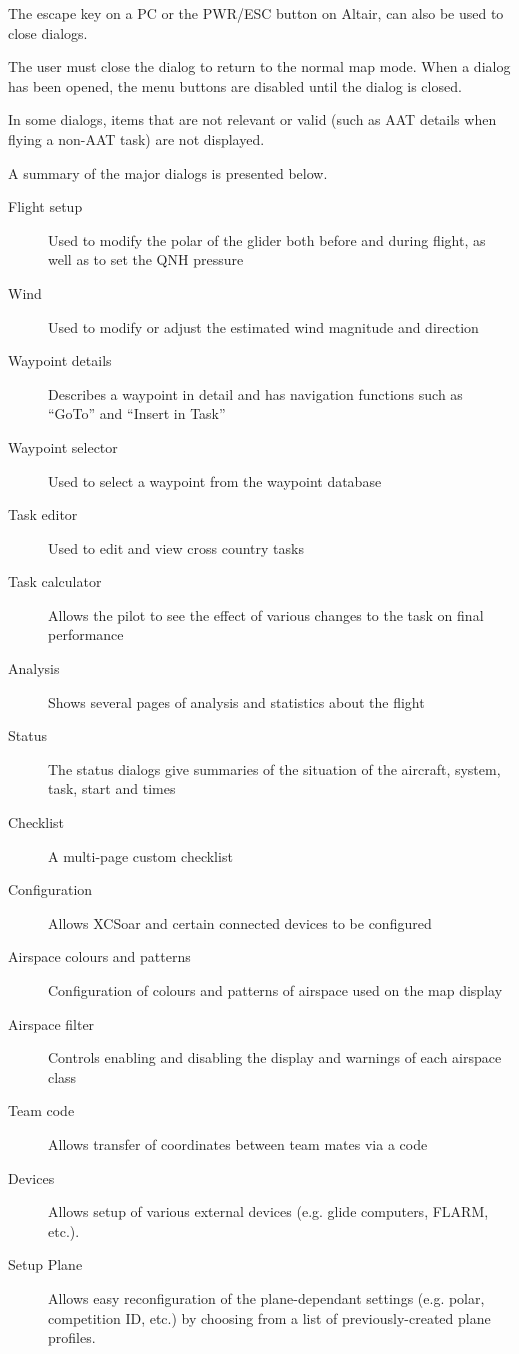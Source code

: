 The escape key on a PC or the PWR/ESC button on Altair, can also be used to
close dialogs.

The user must close the dialog to return to the normal map mode. When a dialog
has been opened, the menu buttons are disabled until the dialog is closed.

In some dialogs, items that are not relevant or valid (such as AAT details when
flying a non-AAT task) are not displayed.

 A summary of the
major dialogs is presented below.
\begin{description}
\item[Flight setup] Used to modify the polar of the glider both before and
during flight, as well as to set the QNH pressure
\item[Wind] Used to modify or adjust the estimated wind magnitude and direction
\item[Waypoint details] Describes a waypoint in detail and has navigation
functions such as ``GoTo'' and ``Insert in Task''
\item[Waypoint selector] Used to select a waypoint from the waypoint database
\item[Task editor] Used to edit and view cross country tasks
\item[Task calculator] Allows the pilot to see the effect of various changes to
the task on final performance
\item[Analysis] Shows several pages of analysis and statistics about the flight
\item[Status] The status dialogs give summaries of the situation of the 
aircraft, system, task, start and times
\item[Checklist] A multi-page custom checklist
\item[Configuration] Allows XCSoar and certain connected devices to be
configured
\item[Airspace colours and patterns] Configuration of colours and patterns of
airspace used on the map display
\item[Airspace filter] Controls enabling and disabling the display and warnings
of each airspace class
\item[Team code] Allows transfer of coordinates between team mates via a code
\item[Devices]  Allows setup of various external devices (e.g. glide computers, FLARM, etc.).
\item[Setup Plane]  Allows easy reconfiguration of the plane-dependant settings (e.g. polar, competition ID, etc.) by choosing from a list of previously-created plane profiles.
\end{description}

